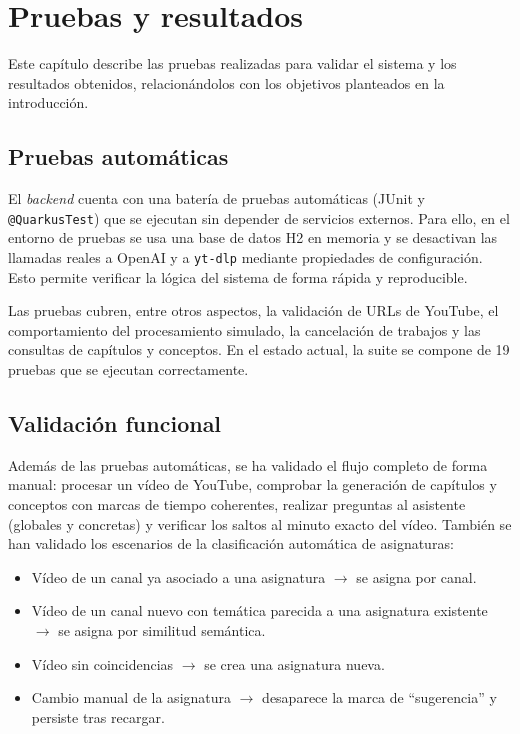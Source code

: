 \chapter{Pruebas y resultados}
\label{cap:pruebas}

Este capítulo describe las pruebas realizadas para validar el sistema y los resultados
obtenidos, relacionándolos con los objetivos planteados en la introducción.

\section{Pruebas automáticas}

El \textit{backend} cuenta con una batería de pruebas automáticas (JUnit y \texttt{@QuarkusTest})
que se ejecutan sin depender de servicios externos. Para ello, en el entorno de pruebas se usa una
base de datos H2 en memoria y se desactivan las llamadas reales a OpenAI y a \texttt{yt-dlp}
mediante propiedades de configuración. Esto permite verificar la lógica del sistema de forma
rápida y reproducible.

Las pruebas cubren, entre otros aspectos, la validación de URLs de YouTube, el comportamiento del
procesamiento simulado, la cancelación de trabajos y las consultas de capítulos y conceptos. En el
estado actual, la suite se compone de 19 pruebas que se ejecutan correctamente.


\section{Validación funcional}

Además de las pruebas automáticas, se ha validado el flujo completo de forma manual: procesar un
vídeo de YouTube, comprobar la generación de capítulos y conceptos con marcas de tiempo
coherentes, realizar preguntas al asistente (globales y concretas) y verificar los saltos al
minuto exacto del vídeo. También se han validado los escenarios de la clasificación automática de
asignaturas:

\begin{itemize}
  \item Vídeo de un canal ya asociado a una asignatura $\rightarrow$ se asigna por canal.
  \item Vídeo de un canal nuevo con temática parecida a una asignatura existente $\rightarrow$ se
        asigna por similitud semántica.
  \item Vídeo sin coincidencias $\rightarrow$ se crea una asignatura nueva.
  \item Cambio manual de la asignatura $\rightarrow$ desaparece la marca de ``sugerencia'' y
        persiste tras recargar.
\end{itemize}

